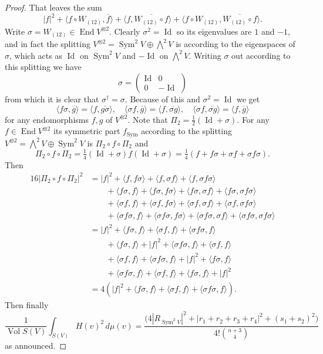 \documentclass[10pt,a4paper]{amsart}
\theoremstyle{definition}
\def\<{\langle}
\def\>{\rangle}
\def\ov#1{\overline{#1}}
\DeclareMathOperator{\Sym}{Sym}
\DeclareMathOperator{\id}{Id}
\DeclareMathOperator{\Vol}{Vol}
\DeclareMathOperator{\End}{End}
\begin{document}
\begin{proof}
That leaves the sum
$$
|f|^2
+ \< f \circ W_{(12)}, \ov f \>
+ \< f, \ov{W_{(12)} \circ f} \>
+ \< f \circ W_{(12)}, \ov{W_{(12)} \circ f} \>.
$$
Write $\sigma = W_{(12)} \in \End V^{\otimes 2}$.
Clearly $\sigma^2 = \id$ so its eigenvalues are $1$ and $-1$, and in fact
the splitting $V^{\otimes 2} = \Sym^2 V \oplus \bigwedge^2 V$
is according to the eigenspaces of $\sigma$,
which acts as $\id$ on $\Sym^2V$ and $-\id$ on $\bigwedge^2 V$.
Writing $\sigma$ out according to this splitting we have
$$
\sigma = \begin{pmatrix}
\id & 0
\\
0 & -\id
\end{pmatrix}
$$
from which it is clear that $\sigma^\dagger = \sigma$.
Because of this and $\sigma^2 = \id$ we get
$$
\< f \sigma, \ov g \> = \<f, \ov{g\sigma}\>,
\quad
\< \sigma f , \ov g \> = \<f, \ov{\sigma g}\>,
\quad
\< \sigma f, \ov{\sigma g} \> = \<f, \ov g\>
$$
for any endomorphisms $f,g$ of $V^{\otimes 2}$.
Note that $\Pi_2 = \frac12(\id + \sigma)$.
For any $f \in \End V^{\otimes 2}$ its symmetric part $f_{\Sym}$ according to
the splitting $V^{\otimes 2} = \bigwedge^2 V \oplus \Sym^2 V$ is $\Pi_2 \circ f
\circ \Pi_2$ and
$$
\Pi_2 \circ f \circ \Pi_2
= \tfrac14 (\id + \sigma) f (\id + \sigma)
= \tfrac14 (f + f \sigma + \sigma f + \sigma f \sigma).
$$
Then
\begin{align*}
16 |\Pi_2 \circ f \circ \Pi_2|^2
&= |f|^2
+ \< f, f \sigma \>
+ \< f, \sigma f \>
+ \< f, \sigma f \sigma \>
\\
&\qquad
+ \< f \sigma, f \>
+ \< f \sigma, f \sigma \>
+ \< f \sigma, \sigma f \>
+ \< f \sigma, \sigma f \sigma \>
\\
&\qquad
+ \< \sigma f, f \>
+ \< \sigma f, f \sigma \>
+ \< \sigma f, \sigma f \>
+ \< \sigma f, \sigma f \sigma \>
\\
&\qquad
+ \< \sigma f \sigma, f \>
+ \< \sigma f \sigma, f \sigma \>
+ \< \sigma f \sigma, \sigma f \>
+ \< \sigma f \sigma, \sigma f \sigma \>
\\
&= |f|^2
+ \< f \sigma, f \>
+ \< \sigma f, f \>
+ \< \sigma f \sigma, f \>
\\
&\qquad
+ \< f \sigma, f \>
+ |f|^2
+ \< \sigma f \sigma, f \>
+ \< \sigma f , f \>
\\
&\qquad
+ \< \sigma f, f \>
+ \< \sigma f \sigma, f \>
+ |f|^2
+ \< f\sigma , f \>
\\
&\qquad
+ \< \sigma f \sigma, f \>
+ \< \sigma f, f \>
+ \< f \sigma, f \>
+ |f|^2
\\
&= 4(|f|^2
+ \< f \sigma, f \>
+ \< \sigma f, f \>
+ \< \sigma f \sigma, f \>).
\end{align*}
Then finally
$$
\frac{1}{\Vol S(V)}
\int_{S(V)}
\!\!\!
H(v)^2 \, d\mu(v)
= \frac{
\bigl(
4 |R_{\Sym^2 V}|^2
+ |r_1 + r_2 + r_3 + r_4|^2
+ (s_1 + s_2)^2
\bigr)
}{4! \binom{n+3}{4}}
$$
as announced.
\end{proof}
\end{document}
